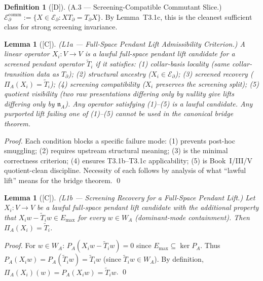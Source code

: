 \documentclass[12pt,oneside]{amsbook}
\theoremstyle{plain}
\newtheorem{lemma}[theorem]{Lemma}
\theoremstyle{definition}
\newtheorem{definition}[theorem]{Definition}
\theoremstyle{remark}
\newcommand{\status}[1]{\textup{[#1]}}
\begin{document}
\begin{definition}[\status{D}]\label{def:commutant-slice}
\textup{(A.3 --- Screening-Compatible Commutant Slice.)}
$\mathcal{E}_\partial^{\mathrm{comm}} := \{X \in \mathcal{E}_\partial :
XT_\partial = T_\partial X\}$.
By Lemma~T3.1c, this is the cleanest sufficient class for strong screening
invariance.
\end{definition}

\begin{lemma}[\status{C}]\label{lem:L1a}
\textup{(L1a --- Full-Space Pendant Lift Admissibility Criterion.)}
A linear operator $X_i : V \to V$ is a \emph{lawful full-space pendant lift
candidate} for a screened pendant operator $\widetilde{T}_i$ if it satisfies:
\textup{(1)} collar-basis locality (same collar-transition data as $T_\partial$);
\textup{(2)} structural ancestry ($X_i \in \mathcal{E}_\partial$);
\textup{(3)} screened recovery ($\Pi_A(X_i) = \widetilde{T}_i$);
\textup{(4)} screening compatibility ($X_i$ preserves the screening split);
\textup{(5)} quotient visibility (two raw presentations differing only by
nullity give lifts differing only by $\mathfrak{n}_A$).
Any operator satisfying \textup{(1)--(5)} is a lawful candidate. Any purported
lift failing one of \textup{(1)--(5)} cannot be used in the canonical bridge theorem.
\end{lemma}

\begin{proof}
Each condition blocks a specific failure mode: (1) prevents post-hoc smuggling;
(2) requires upstream structural meaning; (3) is the minimal correctness criterion;
(4) ensures T3.1b--T3.1c applicability; (5) is Book~I/III/V quotient-clean
discipline. Necessity of each follows by analysis of what ``lawful lift'' means
for the bridge theorem. \qed
\end{proof}

\begin{lemma}[\status{C}]\label{lem:L1b}
\textup{(L1b --- Screening Recovery for a Full-Space Pendant Lift.)}
Let $X_i : V \to V$ be a lawful full-space pendant lift candidate with the
additional property that $X_i w - \widetilde{T}_i w \in E_{\max}$ for every
$w \in W_A$ \textup{(dominant-mode containment)}. Then
$\Pi_A(X_i) = \widetilde{T}_i$.
\end{lemma}

\begin{proof}
For $w \in W_A$: $P_A(X_i w - \widetilde{T}_i w) = 0$ since $E_{\max}
\subseteq \ker P_A$.  Thus $P_A(X_i w) = P_A(\widetilde{T}_i w) =
\widetilde{T}_i w$ (since $\widetilde{T}_i w \in W_A$). By definition,
$\Pi_A(X_i)(w) = P_A(X_i w) = \widetilde{T}_i w$. \qed
\end{proof}
\end{document}
